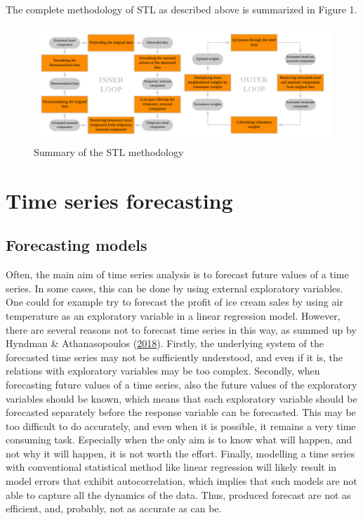 \documentclass[12pt,oneside]{reedthesis}
\begin{document}
The complete methodology of STL as described above is summarized in
Figure 1.
\begin{figure}[h]
\includegraphics[width=\textwidth]{Figures/STL} \caption{Summary of the STL methodology}\label{fig:stl}
\end{figure}
\section{Time series forecasting}\label{time-series-forecasting}

\subsection{Forecasting models}\label{forecasting-models}

Often, the main aim of time series analysis is to forecast future values
of a time series. In some cases, this can be done by using external
exploratory variables. One could for example try to forecast the profit
of ice cream sales by using air temperature as an exploratory variable
in a linear regression model. However, there are several reasons not to
forecast time series in this way, as summed up by Hyndman \&
Athanasopoulos (\protect\hyperlink{ref-hyndman2018fpp}{2018}). Firstly,
the underlying system of the forecasted time series may not be
sufficiently understood, and even if it is, the relations with
exploratory variables may be too complex. Secondly, when forecasting
future values of a time series, also the future values of the
exploratory variables should be known, which means that each exploratory
variable should be forecasted separately before the response variable
can be forecasted. This may be too difficult to do accurately, and even
when it is possible, it remains a very time consuming task. Especially
when the only aim is to know what will happen, and not why it will
happen, it is not worth the effort. Finally, modelling a time series
with conventional statistical method like linear regression will likely
result in model errors that exhibit autocorrelation, which implies that
such models are not able to capture all the dynamics of the data. Thus,
produced forecast are not as efficient, and, probably, not as accurate
as can be.
\end{document}
